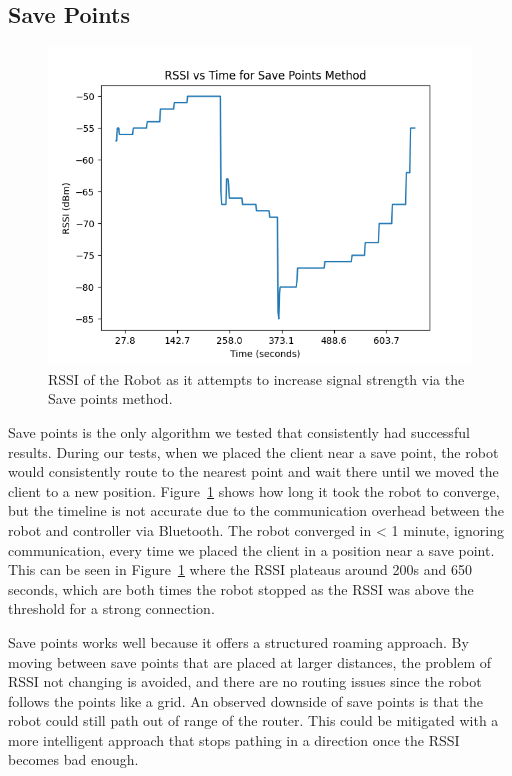 \subsection{Save Points}
\begin{figure}[tp]
\centering
\includegraphics[scale=0.5]{figures/rssi_save_points}
\caption{RSSI of the Robot as it attempts to increase signal strength via the Save points method.}
\label{fig:rssi_save_points}
\end{figure}
Save points is the only algorithm we tested that consistently had successful results. During our tests, when we placed the client near a save point, the robot would consistently route to the nearest point and wait there until we moved the client to a new position. Figure~\ref{fig:rssi_save_points} shows how long it took the robot to converge, but the timeline is not accurate due to the communication overhead between the robot and controller via Bluetooth. The robot converged in < 1 minute, ignoring communication, every time we placed the client in a position near a save point. This can be seen in Figure~\ref{fig:rssi_save_points} where the RSSI plateaus around 200s and 650 seconds, which are both times the robot stopped as the RSSI was above the threshold for a strong connection. 

Save points works well because it offers a structured roaming approach. By moving between save points that are placed at larger distances, the problem of RSSI not changing is avoided, and there are no routing issues since the robot follows the points like a grid. An observed downside of save points is that the robot could still path out of range of the router. This could be mitigated with a more intelligent approach that stops pathing in a direction once the RSSI becomes bad enough.

